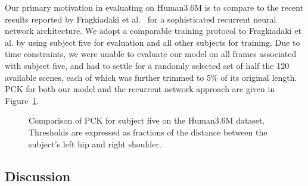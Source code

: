 \documentclass[runningheads]{llncs}
\begin{document}
Our primary motivation in evaluating on Human3.6M is to compare to the recent
results reported by Fragkiadaki et al.~\cite{fragkiadaki2015recurrent} for a
sophisticated recurrent neural network architecture. We adopt a comparable
training protocol to Fragkiadaki et al. by using subject five for evaluation and
all other subjects for training. Due to time constraints, we were unable to
evaluate our model on all frames associated with subject five, and had to settle
for a randomly selected set of half the 120 available scenes, each of which was
further trimmed to 5\% of its original length. PCK for both our model and the
recurrent network approach are given in Figure~\ref{fig:h36m-pck}.

\begin{figure}[t]
\begin{center}

\end{center}
\caption{Comparison of PCK for subject five on the Human3.6M dataset. Thresholds
are expressed as fractions of the distance between the subject's left hip and
right shoulder.}
\label{fig:h36m-pck}
\end{figure}

\subsection{Discussion}

\end{document}

